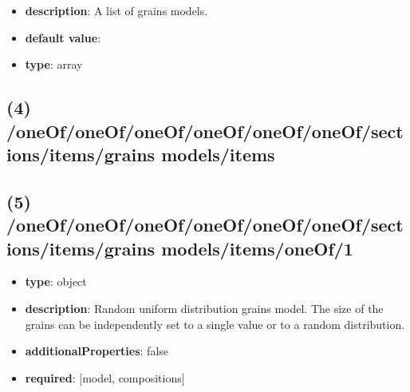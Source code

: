 \begin{itemize}[leftmargin=3em]\item {\bf description}: A list of grains models.
\item {\bf default value}: 
\item {\bf type}: array
\end{itemize}\subsection{(4) /oneOf/oneOf/oneOf/oneOf/oneOf/oneOf/sections/items/grains models/items}

\subsection{(5) /oneOf/oneOf/oneOf/oneOf/oneOf/oneOf/sections/items/grains models/items/oneOf/1}
\begin{itemize}[leftmargin=5em]\item {\bf type}: object
\item {\bf description}: Random uniform distribution grains model. The size of the grains can be independently set to a single value or to a random distribution.
\item {\bf additionalProperties}: false
\item {\bf required}: [model, compositions]\end{itemize}
